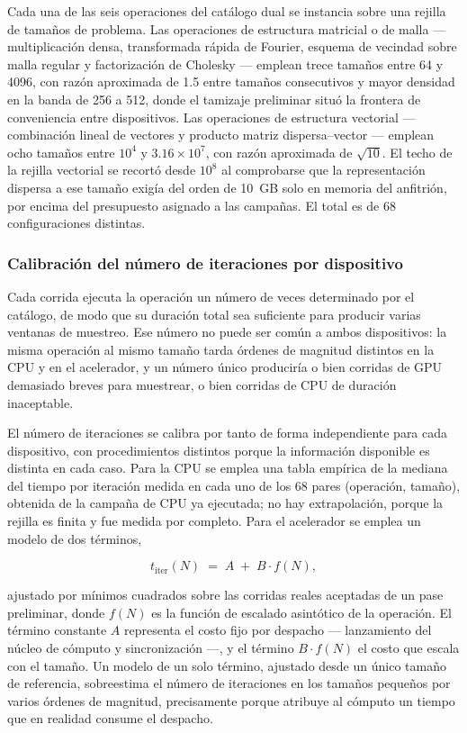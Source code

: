 \documentclass[12pt,oneside,spanish]{book}
\begin{document}
Cada una de las seis operaciones del catálogo dual se instancia sobre una rejilla de tamaños de problema. Las operaciones de estructura matricial o de malla --- multiplicación densa, transformada rápida de Fourier, esquema de vecindad sobre malla regular y factorización de Cholesky --- emplean trece tamaños entre 64 y 4096, con razón aproximada de 1.5 entre tamaños consecutivos y mayor densidad en la banda de 256 a 512, donde el tamizaje preliminar situó la frontera de conveniencia entre dispositivos. Las operaciones de estructura vectorial --- combinación lineal de vectores y producto matriz dispersa--vector --- emplean ocho tamaños entre $10^4$ y $3.16\times10^7$, con razón aproximada de $\sqrt{10}$. El techo de la rejilla vectorial se recortó desde $10^8$ al comprobarse que la representación dispersa a ese tamaño exigía del orden de 10~GB solo en memoria del anfitrión, por encima del presupuesto asignado a las campañas. El total es de 68 configuraciones distintas.

\subsubsection*{Calibración del número de iteraciones por dispositivo}

Cada corrida ejecuta la operación un número de veces determinado por el catálogo, de modo que su duración total sea suficiente para producir varias ventanas de muestreo. Ese número no puede ser común a ambos dispositivos: la misma operación al mismo tamaño tarda órdenes de magnitud distintos en la CPU y en el acelerador, y un número único produciría o bien corridas de GPU demasiado breves para muestrear, o bien corridas de CPU de duración inaceptable.

El número de iteraciones se calibra por tanto de forma independiente para cada dispositivo, con procedimientos distintos porque la información disponible es distinta en cada caso. Para la CPU se emplea una tabla empírica de la mediana del tiempo por iteración medida en cada uno de los 68 pares (operación, tamaño), obtenida de la campaña de CPU ya ejecutada; no hay extrapolación, porque la rejilla es finita y fue medida por completo. Para el acelerador se emplea un modelo de dos términos,

\begin{equation}
\label{eq:iteraciones-gpu}
t_{\text{iter}}(N) \;=\; A \;+\; B \cdot f(N),
\end{equation}

ajustado por mínimos cuadrados sobre las corridas reales aceptadas de un pase preliminar, donde $f(N)$ es la función de escalado asintótico de la operación. El término constante $A$ representa el costo fijo por despacho --- lanzamiento del núcleo de cómputo y sincronización ---, y el término $B\cdot f(N)$ el costo que escala con el tamaño. Un modelo de un solo término, ajustado desde un único tamaño de referencia, sobreestima el número de iteraciones en los tamaños pequeños por varios órdenes de magnitud, precisamente porque atribuye al cómputo un tiempo que en realidad consume el despacho.
\end{document}
